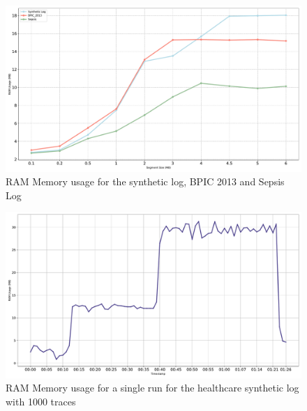 \begin{figure}[t]
\centering
\includegraphics[width=1\linewidth]{content/figures/lineplot_segsize_combined.pdf}
\caption{RAM Memory usage for the synthetic log, BPIC 2013 and Sepsis Log}
\label{fig:lineplot_segsize_combined}
\end{figure}


\begin{figure}[t]
\centering
\includegraphics[width=1\linewidth]{content/figures/ram_usage_per_TS.pdf}
\caption{RAM Memory usage for a single run for the healthcare synthetic log with 1000 traces}
\label{fig:ramusage_ts}
\end{figure}

